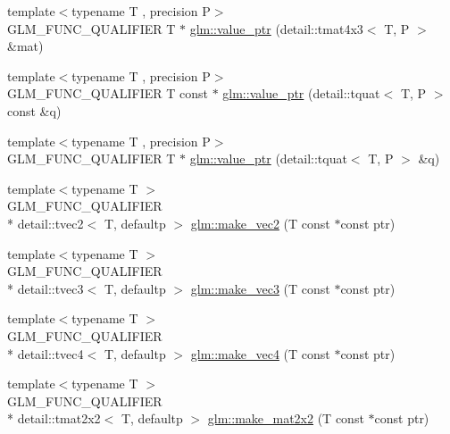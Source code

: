 \begin{DoxyCompactItemize}
\item 
{\footnotesize template$<$typename T , precision P$>$ }\\G\-L\-M\-\_\-\-F\-U\-N\-C\-\_\-\-Q\-U\-A\-L\-I\-F\-I\-E\-R T $\ast$ \hyperlink{group__gtc__type__ptr_ga4a4b23867cc26441441ff4458844fa27}{glm\-::value\-\_\-ptr} (detail\-::tmat4x3$<$ T, P $>$ \&mat)
\item 
{\footnotesize template$<$typename T , precision P$>$ }\\G\-L\-M\-\_\-\-F\-U\-N\-C\-\_\-\-Q\-U\-A\-L\-I\-F\-I\-E\-R T const $\ast$ \hyperlink{group__gtc__type__ptr_ga961a5b150a0ffd632aaa0252c4d6b9ab}{glm\-::value\-\_\-ptr} (detail\-::tquat$<$ T, P $>$ const \&q)
\item 
{\footnotesize template$<$typename T , precision P$>$ }\\G\-L\-M\-\_\-\-F\-U\-N\-C\-\_\-\-Q\-U\-A\-L\-I\-F\-I\-E\-R T $\ast$ \hyperlink{group__gtc__type__ptr_gab72389186ae9e8c822ff6cc9b474a37f}{glm\-::value\-\_\-ptr} (detail\-::tquat$<$ T, P $>$ \&q)
\item 
{\footnotesize template$<$typename T $>$ }\\G\-L\-M\-\_\-\-F\-U\-N\-C\-\_\-\-Q\-U\-A\-L\-I\-F\-I\-E\-R \\*
detail\-::tvec2$<$ T, defaultp $>$ \hyperlink{group__gtc__type__ptr_ga70f570befb4773ba3a658b76f9fdd6ab}{glm\-::make\-\_\-vec2} (T const $\ast$const ptr)
\item 
{\footnotesize template$<$typename T $>$ }\\G\-L\-M\-\_\-\-F\-U\-N\-C\-\_\-\-Q\-U\-A\-L\-I\-F\-I\-E\-R \\*
detail\-::tvec3$<$ T, defaultp $>$ \hyperlink{group__gtc__type__ptr_gad91a6a0fe324630b151208703a1591ed}{glm\-::make\-\_\-vec3} (T const $\ast$const ptr)
\item 
{\footnotesize template$<$typename T $>$ }\\G\-L\-M\-\_\-\-F\-U\-N\-C\-\_\-\-Q\-U\-A\-L\-I\-F\-I\-E\-R \\*
detail\-::tvec4$<$ T, defaultp $>$ \hyperlink{group__gtc__type__ptr_ga1b9e0d9ca48d79ba87edc121c1872c44}{glm\-::make\-\_\-vec4} (T const $\ast$const ptr)
\item 
{\footnotesize template$<$typename T $>$ }\\G\-L\-M\-\_\-\-F\-U\-N\-C\-\_\-\-Q\-U\-A\-L\-I\-F\-I\-E\-R \\*
detail\-::tmat2x2$<$ T, defaultp $>$ \hyperlink{group__gtc__type__ptr_ga860d529f631ea6f9a0e510491d29a8ac}{glm\-::make\-\_\-mat2x2} (T const $\ast$const ptr)
\item 

\end{DoxyCompactItemize}
